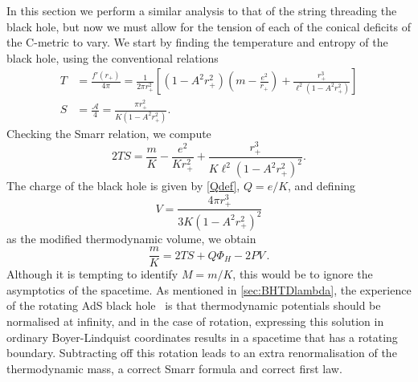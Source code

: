 \documentclass[
twoside,
openright,
frontopenright
]{dmathesis}
\newcommand{\nn}{\nonumber}
\begin{document}
In this section we perform a similar analysis to that of the string threading the 
black hole, but now we must allow for the tension of each of the conical deficits
of the C-metric to vary.
We start by finding the temperature and entropy of the black hole, using
the conventional relations
\begin{align}
  \label{eq:TSNR}
T &= \frac{f'(r_+)}{4\pi} = \frac{1}{2\pi r_+^2} \left [ (1-A^2 r_+^2) \left (
m - \frac{e^2}{r_+}\right) + \frac{r_+^3}{\ell^2(1-A^2 r_+^2)} \right]\nn\\
S &= \frac{\mathcal{A}}{4} =\frac{\pi r_+^2}{K(1-A^2 r_+^2)}.
\end{align}
Checking the Smarr relation, we compute
\begin{equation}
2TS = \frac{m}{K} - \frac{e^2}{K r_+^2} + \frac{r_+^3}{K\ell^2(1-A^2 r_+^2)^2}.
\end{equation}
The charge of the black hole is given by \cref{Qdef}, $Q = e/K$, and defining 
\begin{equation}
  \label{eq:volNR}
V  = \frac{4\pi r_+^3}{3K(1-A^2r_+^2)^2}
\end{equation}
as the modified thermodynamic volume, we obtain
\begin{equation}
\frac{m}{K} = 2 TS  + Q\Phi_H - 2 PV\,.
\end{equation}
Although it is tempting to identify $M=m/K$, this would be to ignore the
asymptotics of the spacetime. As mentioned in \cref{sec:BHTDlambda}, the
experience of the rotating AdS black
hole~\cite{Caldarelli:1999xj,Gibbons:2004ai} is that thermodynamic potentials
should be normalised at infinity, and in the case of rotation, expressing this
solution in ordinary Boyer-Lindquist coordinates results in a spacetime that has
a rotating boundary. Subtracting off this rotation leads to an extra
renormalisation of the thermodynamic mass, a correct Smarr formula and correct
first law. 
\end{document}
